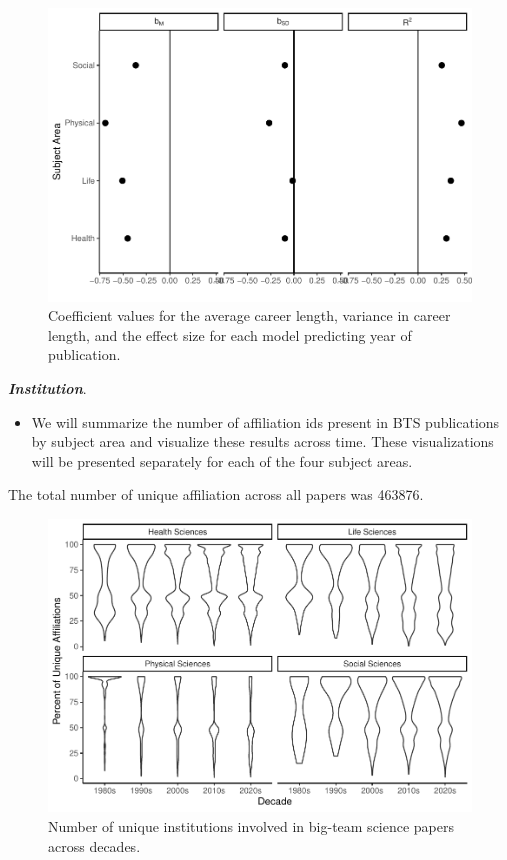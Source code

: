 \documentclass[
  man]{apa7}
\providecommand{\tightlist}{%
  \setlength{\itemsep}{0pt}\setlength{\parskip}{0pt}}
\begin{document}
\begin{figure}
\centering
\includegraphics{manuscript_scopus_files/figure-latex/fig-career-results-1.pdf}
\caption{\label{fig:fig-career-results}Coefficient values for the average career length, variance in career length, and the effect size for each model predicting year of publication.}
\end{figure}

\textbf{\emph{Institution}}.

\begin{itemize}
\tightlist
\item
  We will summarize the number of affiliation ids present in BTS
  publications by subject area and visualize these results across
  time. These visualizations will be presented separately for each of
  the four subject areas.
\end{itemize}

The total number of unique affiliation across all papers was 463876.

\begin{figure}
\centering
\includegraphics{manuscript_scopus_files/figure-latex/fig-inst-1.pdf}
\caption{\label{fig:fig-inst}Number of unique institutions involved in big-team science papers across decades.}
\end{figure}
\end{document}
